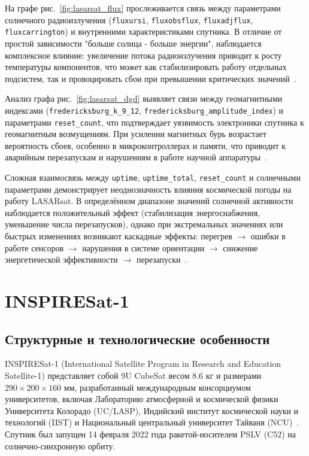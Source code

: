 На графе рис.~\ref{fig:lasarsat_flux}
прослеживается
связь между параметрами солнечного радиоизлучения (\texttt{fluxursi},
\texttt{fluxobsflux}, \texttt{fluxadjflux}, \texttt{fluxcarrington}) и
внутренними характеристиками спутника. В отличие от простой зависимости "больше
солнца - больше энергии", наблюдается комплексное влияние: увеличение потока
радиоизлучения приводит к росту температуры компонентов, что может как
стабилизировать работу отдельных подсистем, так и провоцировать сбои при
превышении критических значений~\cite{lasar_info, satnogs_lasarsat}.

Анализ графа рис.~\ref{fig:lasarsat_dgd}
выявляет
связи между геомагнитными индексами (\texttt{fredericksburg\_k\_9\_12},
\texttt{fredericksburg\_amplitude\_index}) и параметрами \texttt{reset\_count},
что подтверждает уязвимость электроники спутника к геомагнитным возмущениям. При
усилении магнитных бурь возрастает вероятность сбоев, особенно в
микроконтроллерах и памяти, что приводит к аварийным перезапускам и нарушениям в
работе научной аппаратуры~\cite{wiki_lasarsat, satnogs_lasarsat}.

Сложная взаимосвязь между \texttt{uptime}, \texttt{uptime\_total},
\texttt{reset\_count} и солнечными параметрами демонстрирует неоднозначность
влияния космической погоды на работу LASARsat. В определённом диапазоне значений
солнечной активности наблюдается положительный эффект (стабилизация
энергоснабжения, уменьшение числа перезапусков), однако при экстремальных
значениях или быстрых изменениях возникают каскадные эффекты: перегрев
$\rightarrow$ ошибки в работе сенсоров $\rightarrow$ нарушения в системе
ориентации $\rightarrow$ снижение энергетической эффективности $\rightarrow$
перезапуски~\cite{spacemanic_lasarsat, satnogs_lasarsat}.


\section{INSPIRESat-1}

\subsection{Структурные и технологические особенности}

INSPIRESat-1 (International Satellite Program in Research and Education
Satellite-1) представляет собой 9U CubeSat весом 8.6 кг и размерами $290 \times 200 \times
	160$ мм, разработанный международным консорциумом университетов, включая
Лабораторию атмосферной и космической физики Университета Колорадо (UC/LASP),
Индийский институт космической науки и технологий (IIST) и Национальный
центральный университет Тайваня (NCU)~\cite{eoportal_inspiresat,
	nanosats_inspiresat}. Спутник был запущен 14 февраля 2022 года ракетой-носителем
PSLV (C52) на солнечно-синхронную орбиту.

